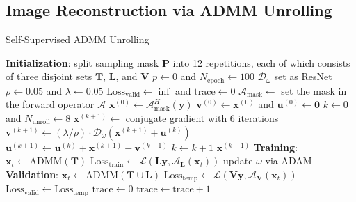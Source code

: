 \documentclass[journal,twoside,web]{ieeecolor}
\begin{document}
	\subsection{Image Reconstruction via ADMM Unrolling}

	\begin{algorithm}
		\caption{Self-Supervised ADMM Unrolling} \label{ALG:ADMM}
		\begin{algorithmic}[1]
			\State \textbf{Initialization}:
			\State \;\; split sampling mask $\mathbf{P}$ into 12 repetitions, each of which consists of three disjoint sets $\mathbf{T}$, $\mathbf{L}$, and $\mathbf{V}$
			\State \;\: $p \gets 0$ and $N_{\mathrm{epoch}} \gets 100$
			\State \;\; $\mathcal{D}_{\omega}$ set as ResNet
			\State \;\; $\rho \gets 0.05$ and $\lambda \gets 0.05$
			\State \;\; $\mathrm{Loss}_{\mathrm{valid}} \gets \inf$ and $\mathrm{trace} \gets 0$
			\State $\mathcal{A}_\mathrm{mask} \gets$ set the mask in the forward operator $\mathcal{A}$
			\State $\mathbf{x}^{(0)} \gets \mathcal{A}_\mathrm{mask}^H (\mathbf{y})$
			\State $\mathbf{v}^{(0)} \gets \mathbf{x}^{(0)}$ and $\mathbf{u}^{(0)} \gets \mathbf{0}$
			\State $k \gets 0$ and $N_{\mathrm{unroll}} \gets 8$
			\State $\mathbf{x}^{(k+1)} \gets $ conjugate gradient with 6 iterations
			\State $\mathbf{v}^{(k+1)} \gets (\lambda/\rho) \cdot \mathcal{D}_{\omega} (\mathbf{x}^{(k+1)} + \mathbf{u}^{(k)})$
			\State $\mathbf{u}^{(k+1)} \gets \mathbf{u}^{(k)} + \mathbf{x}^{(k+1)} - \mathbf{v}^{(k+1)}$
			\State $k \gets k+1$
			\EndWhile
			\State \Return $\mathbf{x}^{(k+1)}$
			\EndFunction
			\State \textbf{Training}:
			\State $\mathbf{x}_t \gets \mathrm{ADMM}(\mathbf{T})$
			\State $\mathrm{Loss}_{\mathrm{train}} \gets \mathcal{L}(\mathbf{L} \mathbf{y}, \mathcal{A}_\mathbf{L}(\mathbf{x}_t))$
			\State update $\omega$ via ADAM
			\State \textbf{Validation}:
			\State $\mathbf{x}_t \gets \mathrm{ADMM}(\mathbf{T} \cup \mathbf{L})$
			\State $\mathrm{Loss}_{\mathrm{temp}} \gets \mathcal{L}(\mathbf{V} \mathbf{y}, \mathcal{A}_\mathbf{V}(\mathbf{x}_t))$
			\State $\mathrm{Loss}_{\mathrm{valid}} \gets \mathrm{Loss}_{\mathrm{temp}}$
			\State $\mathrm{trace} \gets 0$
			\Else
			\State $\mathrm{trace} \gets \mathrm{trace} + 1$
			\EndIf
			\EndWhile
		\end{algorithmic}
	\end{algorithm}
\end{document}
